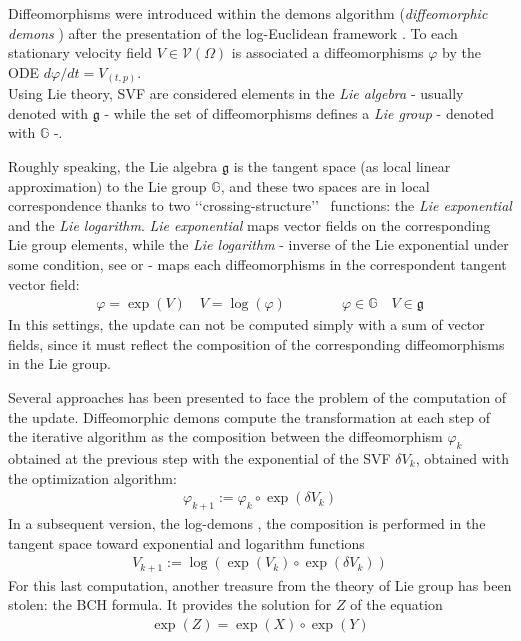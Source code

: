 Diffeomorphisms were introduced within the demons algorithm (\emph{diffeomorphic demons} \cite{vercauteren2006robust}) after the presentation of the log-Euclidean framework \cite{Arsigny:MRM:06}. 
To each stationary velocity field $V \in \mathcal{V}(\Omega)$ is associated a diffeomorphisms $\varphi$ by the ODE $d\varphi /dt = V_{(t,p)} $.\\
Using Lie theory, SVF are considered elements in the \emph{Lie algebra} - usually denoted with $\mathfrak{g}$ - while the set of diffeomorphisms defines a \emph{Lie group} - denoted with $\mathbb{G}$ -.

Roughly speaking, the Lie algebra $\mathfrak{g}$ is the tangent space (as local linear approximation) to the Lie group $\mathbb{G}$, and these two spaces are in local correspondence thanks to two \lq\lq crossing-structure\rq\rq~ functions: the \emph{Lie exponential} and the \emph{Lie logarithm}. \emph{Lie exponential} maps vector fields on the corresponding Lie group elements, while the \emph{Lie logarithm} - inverse of the Lie exponential under some condition, see \cite{do1976differential} or \cite{lee2012introduction} - maps each diffeomorphisms in the correspondent tangent vector field:
\begin{align*}
\varphi = \exp(V)  
\quad
V = \log(\varphi ) 
\qquad \qquad
\varphi  \in \mathbb{G}
\quad
V \in \mathfrak{g}
\end{align*}
In this settings, the update can not be computed simply with a sum of vector fields, since it must reflect the composition of the corresponding diffeomorphisms in the Lie group.


Several approaches has been presented to face the problem of the computation of the update. Diffeomorphic demons compute the transformation at each step of the iterative algorithm as the composition between the diffeomorphism $\varphi_{k}$ obtained at the previous step with the exponential of the SVF $\delta V_{k}$, obtained with the optimization algorithm:
\begin{align*}
\varphi_{k + 1} := \varphi_{k}  \circ \exp(\delta V_{k})
\end{align*}
In a subsequent version, the log-demons \cite{vercauteren08}, the composition is performed in the tangent space toward exponential and logarithm functions
\begin{align}\label{eq:bch_problem}
V_{k + 1} := \log( \exp(V_{k})  \circ \exp(\delta V_{k}))
\end{align}
For this last computation, another treasure from the theory of Lie group has been stolen: the BCH formula. It provides the solution for $Z$ of the equation 
\begin{align*}
 \exp(Z) = \exp(X)\circ\exp(Y)
\end{align*}

